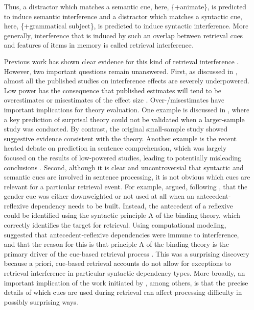 \documentclass[a4paper, man, floatsintext]{apa7}
\begin{document}
Thus, a distractor which matches a semantic cue, here, \{+animate\}, is predicted to induce semantic interference and a distractor which matches a syntactic cue, here, \{+grammatical subject\}, is predicted to induce syntactic interference. More generally, interference that is induced by such an overlap between retrieval cues and features of items in memory is called retrieval interference. 

Previous work has shown clear evidence for this kind of retrieval interference \parencite{vandyke07, vandyke_mcelree06, vandyke_mcelree2011, nicenboim,  vandyke_lewis03,jaeger_etal_2017}.
However, two important questions remain unanswered. First, as discussed in \textcite{jaeger_etal_2017}, almost all the published studies on interference effects are severely underpowered. Low power has the consequence that published estimates will tend to be overestimates or misestimates of the effect size \parencite{vasishth2018_signficancefilter}. Over-/misestimates have important implications for theory evaluation. One example is discussed in \textcite{vasishth2018_signficancefilter}, where a key prediction of surprisal theory \parencite{levy&keller_2013} could not be validated when a larger-sample study was conducted. By contrast, the original small-sample study \parencite{levy&keller_2013} showed suggestive evidence consistent with the theory. Another example is the recent heated debate on prediction in sentence comprehension, which was largely focused on the results of low-powered studies, leading to potentially misleading conclusions \parencite{nicenboim_etal_2020}.
Second, although it is clear and uncontroversial \parencite[e.g.,][]{vandyke07,mertzen} that syntactic and semantic cues are involved in sentence processing, it is not obvious which cues are relevant for a particular retrieval event. For example, \textcite{dillon2013} argued, following \textcite{Sturt2003}, that the gender cue was either downweighted or not used at all when an antecedent-reflexive dependency needs to be built. Instead, the antecedent of a reflexive could be identified using the syntactic principle A of the binding theory, which correctly identifies the target for retrieval.  Using computational modeling, \textcite{dillon2013} suggested that antecedent-reflexive dependencies were immune to interference, and that the reason for this is that principle A of the binding theory is the primary driver of the cue-based retrieval process \parencite[cf. ][]{jaeger_etal_2020,yadav2021individual}. This was a surprising discovery because a priori, cue-based retrieval accounts do not allow for exceptions to retrieval interference in particular syntactic dependency types.
More broadly, an important implication of the work initiated by \textcite{dillon2013}, among others, is that  the precise details of which cues are used during retrieval can affect processing difficulty in possibly surprising ways.
\end{document}
